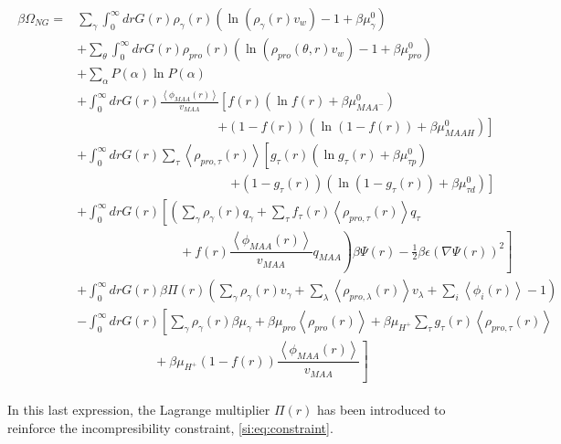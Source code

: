\documentclass[journal=jacsat,manuscript=suppinfo]{achemso}
\begin{document}
\begin{align}
	\begin{aligned}
		\beta\Omega_{NG}=&  \sum_{\gamma}\int_0^\infty{dr G(r)\rho_\gamma(r)\left(\ln \left(\rho_\gamma (r)v_w\right) -1 + \beta\mu^0_\gamma\right)} \\
		& +\sum_\theta \int_0^\infty{dr G(r)\rho_{pro}(r)\left(\ln (\rho_{pro}(\theta,r)v_w)-1 + \beta\mu^0_{pro} \right)} \\
		& + \sum_{\alpha}{P(\alpha)\ln P(\alpha)} \\
		& +\int_0^\infty drG(r) \frac{\left<\phi_{MAA}(r)\right>}{v_{MAA}} \left[f(r)(\ln f(r)+ \beta\mu^0_{MAA^-})\right.\\
		&\qquad \qquad \qquad\qquad \qquad \quad \left.+(1-f(r))(\ln (1-f(r))+\beta\mu^0_{MAAH})\right] \\
		& +\int_0^\infty drG(r)\sum_\tau \left<\rho_{pro,\tau}(r)\right> \left[g_\tau(r)(\ln g_\tau(r)+ \beta\mu^0_{\tau p})\right.\\
		&\qquad\qquad \qquad\qquad \qquad \qquad\left.+(1-g_\tau(r))(\ln (1-g_\tau(r))+\beta\mu^0_{\tau d})\right] \\
		& +  \int_0^\infty drG(r)\left[\left(\sum_{\gamma } \rho_\gamma(r) q_\gamma + \sum_\tau{f_\tau(r) \left<\rho_{pro,\tau}(r)\right> q_\tau} \right. \right. \\ 
		& \left. \left. \hspace{8em}+  f(r)\dfrac{\left<\phi_{MAA}(r)\right>}{v_{MAA}}q_{MAA}\right)\beta\Psi(r)  -\frac{1}{2}\beta\epsilon(\nabla\Psi(r))^2 \right]\\
		&+ \int_0^\infty drG(r)  \beta\Pi(r){\left(\sum_{\gamma}\rho_\gamma(r) v_\gamma + \sum_{\lambda}{\left<\rho_{pro,\lambda}(r)\right>}{v_\lambda} + \sum_i\left<\phi_i(r)\right> -1\right)}\\
		& -\int_0^\infty drG(r)\left[\sum_{\gamma }{\rho_\gamma(r)\beta\mu_\gamma}
		+ \beta\mu_{pro} \left<\rho_{pro}(r)\right>
		+\beta\mu_{H^+}\sum_{\tau}{g_\tau(r)\left<\rho_{pro,\tau}(r)\right> } \right.\\
		& \left. \hspace{6em} +\beta\mu_{H^+}(1-f(r))\dfrac{\left<\phi_{MAA}(r)\right>}{v_{MAA}}\right]%
	\end{aligned}
	\label{eq:si:free-energy_expl}
\end{align}

In this last expression, the Lagrange multiplier $\Pi(r)$ has been introduced to reinforce the incompresibility constraint, \cref{si:eq:constraint}.
\end{document}
